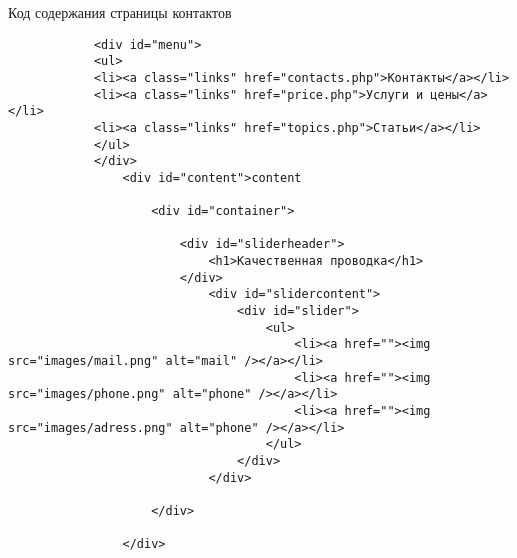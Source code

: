 Код содержания страницы контактов
\begin{verbatim}
			<div id="menu">
			<ul>
			<li><a class="links" href="contacts.php">Контакты</a></li>
			<li><a class="links" href="price.php">Услуги и цены</a></li>
			<li><a class="links" href="topics.php">Статьи</a></li>
			</ul>
			</div>
				<div id="content">content
		
					<div id="container">

						<div id="sliderheader">
							<h1>Качественная проводка</h1>
						</div>
							<div id="slidercontent">
								<div id="slider">
									<ul>				
										<li><a href=""><img src="images/mail.png" alt="mail" /></a></li>
										<li><a href=""><img src="images/phone.png" alt="phone" /></a></li>	
										<li><a href=""><img src="images/adress.png" alt="phone" /></a></li>										
									</ul>
								</div>
							</div>

					</div>

				</div>
\end{verbatim}


